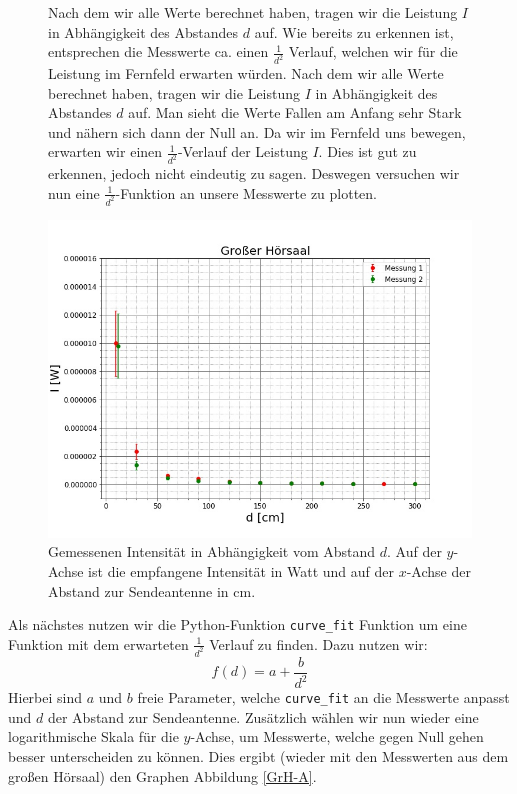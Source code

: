 \documentclass[titlepage,11pt,a4paper,ngerman]{article}
\begin{document}
\begin{figure}[ht]
\begin{minipage}{0.35\linewidth}
	Nach dem wir alle Werte berechnet haben, tragen wir die Leistung $I$ in Abhängigkeit des Abstandes $d$ auf. Wie bereits zu erkennen ist, entsprechen die Messwerte ca. einen $\frac{1}{d^{2}}$ Verlauf, welchen wir für die Leistung im Fernfeld erwarten würden. Nach dem wir alle Werte berechnet haben, tragen wir die Leistung $I$ in Abhängigkeit des Abstandes $d$ auf. Man sieht die Werte Fallen am Anfang sehr Stark und nähern sich dann der Null an. Da wir im Fernfeld uns bewegen, erwarten wir einen $\frac{1}{d^{2}}$-Verlauf der Leistung $I$. Dies ist gut zu erkennen, jedoch nicht eindeutig zu sagen. Deswegen versuchen wir nun eine $\frac{1}{d^{2}}$-Funktion an unsere Messwerte zu plotten.
\end{minipage}
\begin{minipage}{0.6 \linewidth}
	\includegraphics[scale=0.5]{Bilder/bsp}
	\centering
	\caption{Gemessenen Intensität in Abhängigkeit vom Abstand $d$. Auf der $y$-Achse ist die empfangene Intensität in Watt und auf der $x$-Achse der Abstand zur Sendeantenne in cm.}
	\label{Abstand-bsp}
\end{minipage}
\end{figure}



\FloatBarrier
\noindent
Als nächstes nutzen wir die Python-Funktion \verb|curve_fit| \cite{curvescipy} Funktion um eine Funktion mit dem erwarteten $\frac{1}{d^{2}}$ Verlauf zu finden. Dazu nutzen wir:
\begin{equation}
f(d) = a + \frac{b}{d^{2}}
\label{f}
\end{equation}	
Hierbei sind $a$ und $b$ freie Parameter, welche \verb|curve_fit| an die Messwerte anpasst und $d$ der Abstand zur Sendeantenne. Zusätzlich wählen wir nun wieder eine logarithmische Skala für die $y$-Achse, um Messwerte, welche gegen Null gehen besser unterscheiden zu können. Dies ergibt (wieder mit den Messwerten aus dem großen Hörsaal) den Graphen Abbildung \ref{GrH-A}.
\end{document}
